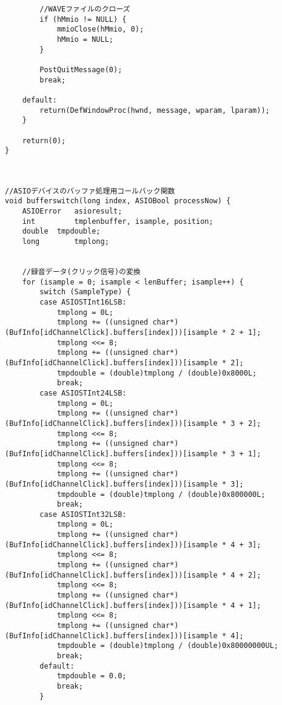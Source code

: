 \begin{verbatim}
		//WAVEファイルのクローズ
		if (hMmio != NULL) {
			mmioClose(hMmio, 0);
			hMmio = NULL;
		}

		PostQuitMessage(0);
		break;

	default:
		return(DefWindowProc(hwnd, message, wparam, lparam));
	}

	return(0);
}



//ASIOデバイスのバッファ処理用コールバック関数
void bufferswitch(long index, ASIOBool processNow) {
	ASIOError	asioresult;
	int			tmplenbuffer, isample, position;
	double	tmpdouble;
	long		tmplong;
	

	//録音データ(クリック信号)の変換
	for (isample = 0; isample < lenBuffer; isample++) {
		switch (SampleType) {
		case ASIOSTInt16LSB:
			tmplong = 0L;
			tmplong += ((unsigned char*)(BufInfo[idChannelClick].buffers[index]))[isample * 2 + 1];
			tmplong <<= 8;
			tmplong += ((unsigned char*)(BufInfo[idChannelClick].buffers[index]))[isample * 2];
			tmpdouble = (double)tmplong / (double)0x8000L;
			break;
		case ASIOSTInt24LSB:
			tmplong = 0L;
			tmplong += ((unsigned char*)(BufInfo[idChannelClick].buffers[index]))[isample * 3 + 2];
			tmplong <<= 8;
			tmplong += ((unsigned char*)(BufInfo[idChannelClick].buffers[index]))[isample * 3 + 1];
			tmplong <<= 8;
			tmplong += ((unsigned char*)(BufInfo[idChannelClick].buffers[index]))[isample * 3];
			tmpdouble = (double)tmplong / (double)0x800000L;
			break;
		case ASIOSTInt32LSB:
			tmplong = 0L;
			tmplong += ((unsigned char*)(BufInfo[idChannelClick].buffers[index]))[isample * 4 + 3];
			tmplong <<= 8;
			tmplong += ((unsigned char*)(BufInfo[idChannelClick].buffers[index]))[isample * 4 + 2];
			tmplong <<= 8;
			tmplong += ((unsigned char*)(BufInfo[idChannelClick].buffers[index]))[isample * 4 + 1];
			tmplong <<= 8;
			tmplong += ((unsigned char*)(BufInfo[idChannelClick].buffers[index]))[isample * 4];
			tmpdouble = (double)tmplong / (double)0x80000000UL;
			break;
		default:
			tmpdouble = 0.0;
			break;
		}


\end{verbatim}
